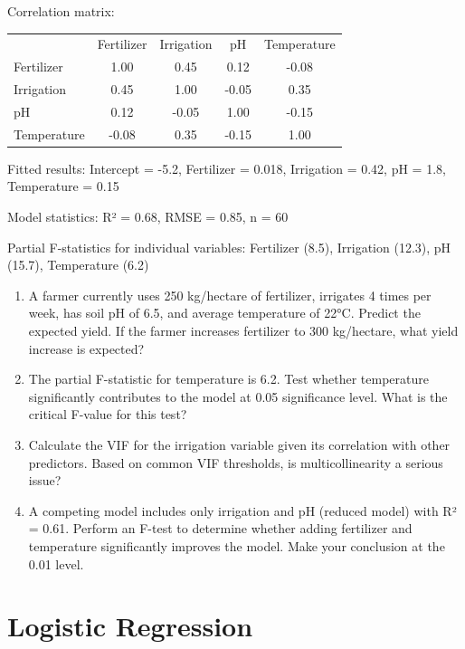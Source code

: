\documentclass[12pt]{article}
\begin{document}
Correlation matrix:
\begin{center}
\begin{tabular}{lcccc}
& Fertilizer & Irrigation & pH & Temperature \\
Fertilizer & 1.00 & 0.45 & 0.12 & -0.08 \\
Irrigation & 0.45 & 1.00 & -0.05 & 0.35 \\
pH & 0.12 & -0.05 & 1.00 & -0.15 \\
Temperature & -0.08 & 0.35 & -0.15 & 1.00 \\
\end{tabular}
\end{center}

Fitted results: Intercept = -5.2, Fertilizer = 0.018, Irrigation = 0.42, pH = 1.8, Temperature = 0.15

Model statistics: R² = 0.68, RMSE = 0.85, n = 60

Partial F-statistics for individual variables: Fertilizer (8.5), Irrigation (12.3), pH (15.7), Temperature (6.2)

\begin{enumerate}[label=(\alph*)]
\item A farmer currently uses 250 kg/hectare of fertilizer, irrigates 4 times per week, has soil pH of 6.5, and average temperature of 22°C. Predict the expected yield. If the farmer increases fertilizer to 300 kg/hectare, what yield increase is expected?

\item The partial F-statistic for temperature is 6.2. Test whether temperature significantly contributes to the model at 0.05 significance level. What is the critical F-value for this test?

\item Calculate the VIF for the irrigation variable given its correlation with other predictors. Based on common VIF thresholds, is multicollinearity a serious issue?

\item A competing model includes only irrigation and pH (reduced model) with R² = 0.61. Perform an F-test to determine whether adding fertilizer and temperature significantly improves the model. Make your conclusion at the 0.01 level.
\end{enumerate}


\section{Logistic Regression}
\end{document}

